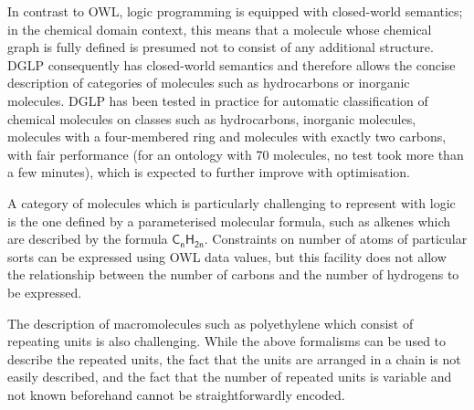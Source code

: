 \documentclass[10pt]{bmc_article}
\newenvironment{bmcformat}{\baselineskip20pt\sloppy\setboolean{publ}{false}}{\baselineskip20pt\sloppy}
\begin{document}
\begin{bmcformat}
In contrast to OWL, logic programming is equipped with closed-world semantics; in the chemical domain context, this means that a molecule whose chemical graph is fully defined is presumed not to consist of any additional structure. DGLP \cite{magka2011} consequently has closed-world semantics and therefore allows the concise description of categories of molecules such as hydrocarbons or inorganic molecules. DGLP has been tested in practice for automatic classification of chemical molecules on classes such as hydrocarbons, inorganic molecules, molecules with a four-membered ring and molecules with exactly two carbons, with fair performance (for an ontology with 70 molecules, no test took more than a few minutes), which is expected to further improve with optimisation. %

A category of molecules which is particularly challenging to represent with logic is the one defined by a parameterised molecular formula, such as alkenes which are described by the formula $\mathsf{C_nH_{2n}}$. Constraints on number of atoms of particular sorts can be expressed using OWL data values, but this facility does not allow the relationship between the number of carbons and the number of hydrogens to be expressed.  

The description of macromolecules such as polyethylene which consist of repeating units is also challenging. While the above formalisms can be used to describe the repeated units, the fact that the units are arranged in a chain is not easily described, and the fact that the number of repeated units is variable and not known beforehand cannot be straightforwardly encoded. %

% 




\end{bmcformat}
\end{document}
